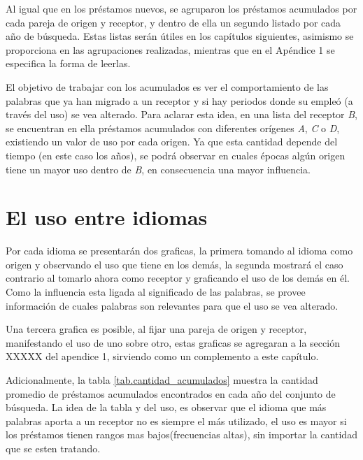 Al igual que en los préstamos nuevos,  se agruparon los préstamos acumulados por cada pareja de origen y receptor,  y dentro de ella un segundo listado por cada año de búsqueda.  Estas listas serán útiles en los capítulos siguientes,  asimismo se proporciona en \cite{prestamos_acumulados} las agrupaciones realizadas, mientras que en el Apéndice 1 se especifica la forma de leerlas. 

El objetivo  de trabajar con los acumulados es ver el comportamiento de las palabras que ya han migrado a un receptor y si hay periodos donde su empleó (a través del uso) se vea alterado. Para aclarar esta idea, en una lista del receptor \textit{B}, se encuentran en ella préstamos acumulados con diferentes orígenes \textit{A}, \textit{C} o \textit{D},  existiendo un valor de uso por cada origen. Ya que esta cantidad depende del tiempo (en este caso los  años),  se podrá observar en cuales épocas algún origen tiene un mayor uso dentro de \textit{B},  en consecuencia una mayor influencia. 

\section {El uso entre idiomas} 

Por cada idioma se presentarán dos graficas, la primera tomando al idioma como origen y observando el uso que tiene en los demás, la segunda mostrará el caso contrario al tomarlo ahora como receptor y graficando el uso de los demás en él.  Como la influencia esta ligada al significado de las palabras, se provee información de cuales palabras son relevantes para
que el uso se vea alterado. 


Una tercera grafica es posible, al fijar una pareja de origen y receptor, manifestando el uso de uno sobre otro,  estas graficas se agregaran a la sección XXXXX del apendice 1, sirviendo como un complemento a este capítulo. 


Adicionalmente, la tabla \ref{tab.cantidad_acumulados} muestra la cantidad promedio de préstamos acumulados encontrados en cada año del conjunto de búsqueda. La idea de la tabla y del uso, es observar que el idioma que más palabras aporta a un receptor no es siempre el más utilizado,  el uso es mayor si los préstamos tienen rangos mas bajos(frecuencias altas), sin importar la cantidad que se esten tratando. 


